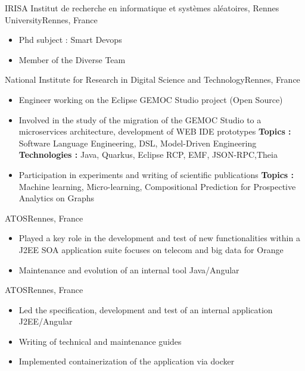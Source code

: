 {IRISA Institut de recherche en informatique et systèmes aléatoires, Rennes University}{Rennes, France}
{
\begin{itemize}
    \item Phd subject : Smart Devops 
    \item Member of the Diverse Team
\end{itemize}
 }
{National Institute for Research in Digital Science and Technology}{Rennes, France}
{\begin{itemize}
\item Engineer working on the Eclipse GEMOC Studio project (Open Source)
\item Involved in the study of the migration of the GEMOC Studio to a microservices architecture, development of WEB IDE prototypes 
\textbf{Topics :} Software Language Engineering, DSL, Model-Driven Engineering     \textbf{Technologies :} Java, Quarkus, Eclipse RCP, EMF, JSON-RPC,Theia
\item Participation in experiments and writing of scientific publications
\textbf{Topics :} Machine learning, Micro-learning, Compositional Prediction for Prospective Analytics on Graphs
\end{itemize}}
{ATOS}{Rennes, France}
{
\begin{itemize}
\item Played a key role in the development and test of new functionalities within a J2EE SOA application suite focuses on telecom and big data for Orange
\item Maintenance and evolution of an internal tool Java/Angular
\end{itemize}
}
{ATOS}{Rennes, France}
{\begin{itemize}
\item Led the specification, development and test of an internal application J2EE/Angular
\item Writing of technical and maintenance guides
\item Implemented containerization of the application via docker
\end{itemize}}